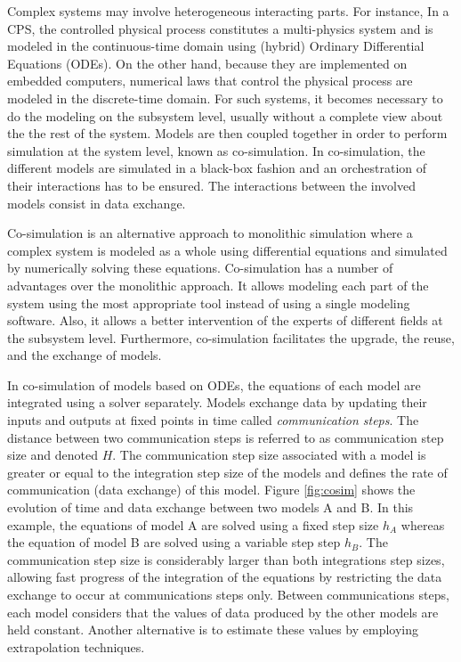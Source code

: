 Complex systems may involve heterogeneous interacting parts. For instance, In a CPS, the controlled physical process constitutes a multi-physics system and is modeled in the continuous-time domain using (hybrid) Ordinary Differential Equations (ODEs). On the other hand, because they are implemented on embedded computers, numerical laws that control the physical process are modeled in the discrete-time domain. For such systems, it becomes necessary to do the modeling on the subsystem level, usually without a complete view about the the rest of the system. Models are then coupled together in order to perform simulation at the system level, known as co-simulation. In co-simulation, the different models are simulated in a black-box fashion and an orchestration of their interactions has to be ensured. The interactions between the involved models consist in data exchange.

Co-simulation is an alternative approach to monolithic simulation where a complex system is modeled as a whole using differential equations and simulated by numerically solving these equations. Co-simulation has a number of advantages over the monolithic approach. It allows modeling each part of the system using the most appropriate tool instead of using a single modeling software. Also, it allows a better intervention of the experts of different fields at the subsystem level. Furthermore, co-simulation facilitates the upgrade, the reuse, and the exchange of models. 

In co-simulation of models based on ODEs, the equations of each model are integrated using a solver separately. Models exchange data by updating their inputs and outputs at fixed points in time called \textit{communication steps}. The distance between two communication steps is referred to as communication step size and denoted $H$. The communication step size associated with a model is greater or equal to the integration step size of the models and defines the rate of communication (data exchange) of this model. Figure \ref{fig:cosim} shows the evolution of time and data exchange between two models A and B. In this example, the equations of model A are solved using a fixed step size $h_A$ whereas the equation of model B are solved using a variable step step $h_B$. The communication step size is considerably larger than both integrations step sizes, allowing fast progress of the integration of the equations by restricting the data exchange to occur at communications steps only. Between communications steps, each model considers that the values of data produced by the other models are held constant. Another alternative is to estimate these values by employing extrapolation techniques.

